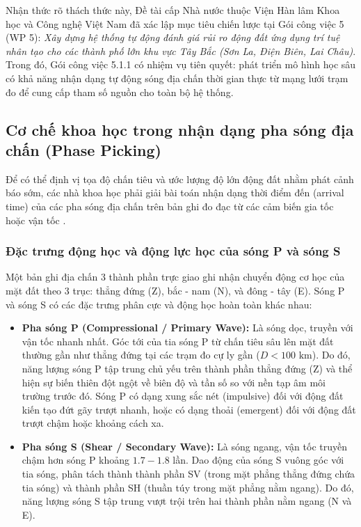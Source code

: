 \documentclass[preprint,1p]{elsarticle}
\begin{document}
Nhận thức rõ thách thức này, Đề tài cấp Nhà nước thuộc Viện Hàn lâm Khoa học và Công nghệ Việt Nam đã xác lập mục tiêu chiến lược tại Gói công việc 5 (WP 5): \textit{Xây dựng hệ thống tự động đánh giá rủi ro động đất ứng dụng trí tuệ nhân tạo cho các thành phố lớn khu vực Tây Bắc (Sơn La, Điện Biên, Lai Châu)}. Trong đó, Gói công việc 5.1.1 có nhiệm vụ tiên quyết: phát triển mô hình học sâu có khả năng nhận dạng tự động sóng địa chấn thời gian thực từ mạng lưới trạm đo để cung cấp tham số nguồn cho toàn bộ hệ thống.

\subsection{Cơ chế khoa học trong nhận dạng pha sóng địa chấn (Phase Picking)}
\label{sec:intro_picks}

Để có thể định vị tọa độ chấn tiêu và ước lượng độ lớn động đất nhằm phát cảnh báo sớm, các nhà khoa học phải giải bài toán nhận dạng thời điểm đến (arrival time) của các pha sóng địa chấn trên bản ghi đo đạc từ các cảm biến gia tốc hoặc vận tốc \cite{allen1978automatic,zhu2019phasenet}.

\subsubsection{Đặc trưng động học và động lực học của sóng P và sóng S}
Một bản ghi địa chấn 3 thành phần trực giao ghi nhận chuyển động cơ học của mặt đất theo 3 trục: thẳng đứng (Z), bắc - nam (N), và đông - tây (E). Sóng P và sóng S có các đặc trưng phân cực và động học hoàn toàn khác nhau:
\begin{itemize}
    \item \textbf{Pha sóng P (Compressional / Primary Wave):} Là sóng dọc, truyền với vận tốc nhanh nhất. Góc tới của tia sóng P từ chấn tiêu sâu lên mặt đất thường gần như thẳng đứng tại các trạm đo cự ly gần ($D < 100\text{ km}$). Do đó, năng lượng sóng P tập trung chủ yếu trên thành phần thẳng đứng (Z) và thể hiện sự biến thiên đột ngột về biên độ và tần số so với nền tạp âm môi trường trước đó. Sóng P có dạng xung sắc nét (impulsive) đối với động đất kiến tạo đứt gãy trượt nhanh, hoặc có dạng thoải (emergent) đối với động đất trượt chậm hoặc khoảng cách xa.
    \item \textbf{Pha sóng S (Shear / Secondary Wave):} Là sóng ngang, vận tốc truyền chậm hơn sóng P khoảng $1.7 - 1.8$ lần. Dao động của sóng S vuông góc với tia sóng, phân tách thành thành phần SV (trong mặt phẳng thẳng đứng chứa tia sóng) và thành phần SH (thuần túy trong mặt phẳng nằm ngang). Do đó, năng lượng sóng S tập trung vượt trội trên hai thành phần nằm ngang (N và E).
\end{itemize}
\end{document}

